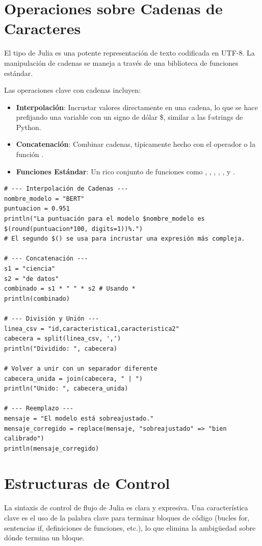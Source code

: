 \section{Operaciones sobre Cadenas de Caracteres}
\label{sec:julia_string_ops}
El tipo  de Julia es una potente representación de texto codificada en UTF-8. La manipulación de cadenas se maneja a través de una biblioteca de funciones estándar.

Las operaciones clave con cadenas incluyen:
\begin{itemize}
    \item \textbf{Interpolación}: Incrustar valores directamente en una cadena, lo que se hace prefijando una variable con un signo de dólar \$, similar a las f-strings de Python.
    \item \textbf{Concatenación}: Combinar cadenas, típicamente hecho con el operador \jcode{*} o la función .
    \item \textbf{Funciones Estándar}: Un rico conjunto de funciones como , , , , , y .
\end{itemize}

\begin{example}
\text{ }\begin{verbatim}
# --- Interpolación de Cadenas ---
nombre_modelo = "BERT"
puntuacion = 0.951
println("La puntuación para el modelo $nombre_modelo es $(round(puntuacion*100, digits=1))%.")
# El segundo $() se usa para incrustar una expresión más compleja.

# --- Concatenación ---
s1 = "ciencia"
s2 = "de datos"
combinado = s1 * " " * s2 # Usando *
println(combinado)

# --- División y Unión ---
linea_csv = "id,caracteristica1,caracteristica2"
cabecera = split(linea_csv, ',')
println("Dividido: ", cabecera)

# Volver a unir con un separador diferente
cabecera_unida = join(cabecera, " | ")
println("Unido: ", cabecera_unida)

# --- Reemplazo ---
mensaje = "El modelo está sobreajustado."
mensaje_corregido = replace(mensaje, "sobreajustado" => "bien calibrado")
println(mensaje_corregido)
\end{verbatim}
\end{example}

\section{Estructuras de Control}
\label{sec:julia_control_structures}
La sintaxis de control de flujo de Julia es clara y expresiva. Una característica clave es el uso de la palabra clave  para terminar bloques de código (bucles for, sentencias if, definiciones de funciones, etc.), lo que elimina la ambigüedad sobre dónde termina un bloque.


